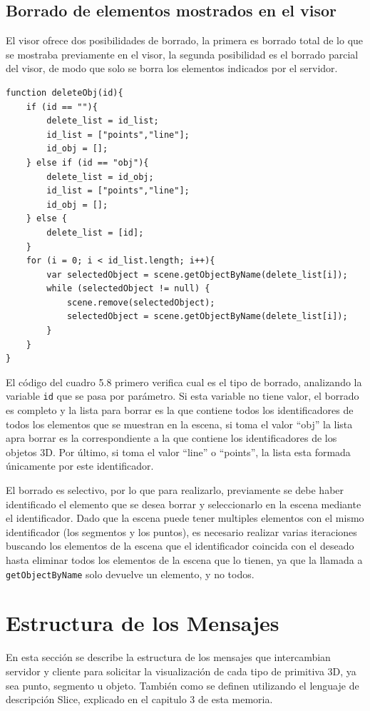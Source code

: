 \subsection{Borrado de elementos mostrados en el visor}
El visor ofrece dos posibilidades de borrado, la primera es borrado total de lo que se mostraba previamente en el visor, la segunda posibilidad es el borrado parcial del visor, de modo que solo se borra los elementos indicados por el servidor.
\begin{lstlisting}[caption= Código para realizar el borrado de elementos mostrados en el visor, label=cod.borrarelementos]
function deleteObj(id){
	if (id == ""){
		delete_list = id_list;
		id_list = ["points","line"];
		id_obj = [];
	} else if (id == "obj"){
		delete_list = id_obj;
		id_list = ["points","line"];
		id_obj = [];
	} else {
		delete_list = [id];
	}
	for (i = 0; i < id_list.length; i++){
		var selectedObject = scene.getObjectByName(delete_list[i]);
		while (selectedObject != null) {
			scene.remove(selectedObject);
			selectedObject = scene.getObjectByName(delete_list[i]);
		}
	}
}
\end{lstlisting}
El código del cuadro 5.8 primero verifica cual es el tipo de borrado, analizando la variable \texttt{id} que se pasa por parámetro. Si esta variable no tiene valor, el borrado es completo y la lista para borrar es la que contiene todos los identificadores de todos los elementos que se muestran en la escena, si toma el valor ``obj'' la lista apra borrar es la correspondiente a la que contiene los identificadores de los objetos 3D. Por último, si toma el valor ``line'' o ``points'', la lista esta formada únicamente por este identificador.

El borrado es selectivo, por lo que para realizarlo, previamente se debe haber identificado el elemento que se desea borrar y seleccionarlo en la escena mediante el identificador. Dado que la escena puede tener multiples elementos con el mismo identificador (los segmentos y los puntos), es necesario realizar varias iteraciones buscando los elementos de la escena que el identificador coincida con el deseado hasta eliminar todos los elementos de la escena que lo tienen, ya que la llamada a \texttt{getObjectByName} solo devuelve un elemento, y no todos.

\section{Estructura de los Mensajes}
En esta sección se describe la estructura de los mensajes que intercambian servidor y cliente para solicitar la visualización de cada tipo de primitiva 3D, ya sea punto, segmento u objeto. También como se definen utilizando el lenguaje de descripción Slice, explicado en el capitulo 3 de esta memoria. 

